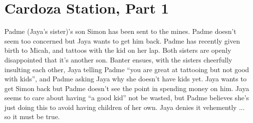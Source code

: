 \setcounter{chapter}{ 2 }
\chapter{\textbf{Cardoza Station, Part 1} }










Padme (Jaya's sister)'s son Simon has been sent to the mines.  Padme doesn't seem too concerned but Jaya wants to get him back.  Padme has recently given birth to Micah, and tattoos with the kid on her lap.  Both sisters are openly disappointed that it's another son.  Banter ensues, with the sisters cheerfully insulting each other, Jaya telling Padme ``you are great at tattooing but not good with kids'', and Padme asking Jaya why she doesn't have kids yet.  Jaya wants to get Simon back but Padme doesn't see the point in spending money on him.  Jaya seems to care about having ``a good kid'' not be wasted, but Padme believes she's just doing this to avoid having children of her own.  Jaya denies it vehemently ... so it must be true.



